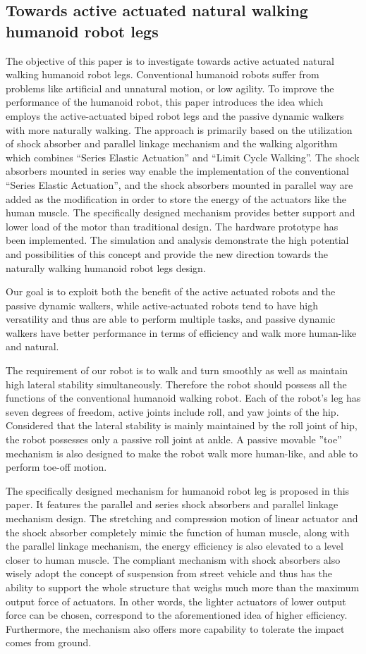 \documentclass{romjist}
\begin{document}
\subsection{Towards active actuated natural walking humanoid robot legs}
\cite{5}The objective of this paper is to investigate towards active actuated natural walking humanoid robot legs. Conventional humanoid robots suffer from problems like artificial and unnatural motion, or low agility. To improve the performance of the humanoid robot, this paper introduces the idea which employs the active-actuated biped robot legs and the passive dynamic walkers with more naturally walking. The approach is primarily based on the utilization of shock absorber and parallel linkage mechanism and the walking algorithm which combines “Series Elastic Actuation” and “Limit Cycle Walking”. The shock absorbers mounted in series way enable the implementation of the conventional “Series Elastic Actuation”, and the shock absorbers mounted in parallel way are added as the modification in order to store the energy of the actuators like the human muscle. The specifically designed mechanism provides better support and lower load of the motor than traditional design. The hardware prototype has been implemented. The simulation and analysis demonstrate the high potential and possibilities of this concept and provide the new direction towards the naturally walking humanoid robot legs design.\par
Our goal is to exploit both the benefit of the active actuated robots and the passive dynamic walkers, while active-actuated robots tend to have high versatility and thus are able to perform multiple tasks, and passive dynamic walkers have better performance in terms of efficiency and walk more human-like and natural.\par
The requirement of our robot is to walk and turn smoothly as well as maintain high lateral stability simultaneously. Therefore the robot should possess all the functions of the conventional humanoid walking robot. Each of the robot’s leg has seven degrees of freedom, active joints include roll, and yaw joints of the hip. Considered that the lateral stability is mainly maintained by the roll joint of hip, the robot possesses only a passive roll joint at ankle. A passive movable ”toe” mechanism is also designed to make the robot walk more human-like, and able to perform toe-off motion.\par
The specifically designed mechanism for humanoid robot leg is proposed in this paper. It features the parallel and series shock absorbers and parallel linkage mechanism design. The stretching and compression motion of linear actuator and the shock absorber completely mimic the function of human muscle, along with the parallel linkage mechanism, the energy efficiency is also elevated to a level closer to human muscle. The compliant mechanism with shock absorbers also wisely adopt the concept of suspension from street vehicle and thus has the ability to support the whole structure that weighs much more than the maximum output force of actuators. In other words, the lighter actuators of lower output force can be chosen, correspond to the aforementioned idea of higher efficiency. Furthermore, the mechanism also offers more capability to tolerate the impact comes from ground.
\end{document}
